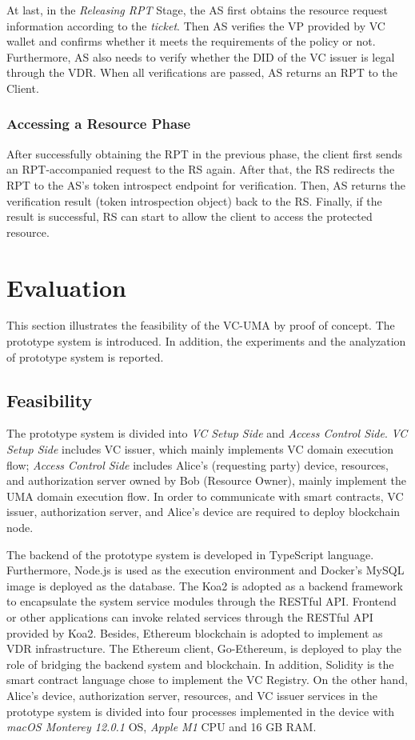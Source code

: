 \documentclass[conference, dvipdfmx]{IEEEtran} %
\begin{document}
\begin{sloppypar}
At last, in the \textit{Releasing RPT} Stage, the AS first obtains the resource request information according to the \textit{ticket}. Then AS verifies the VP provided by VC wallet and confirms whether it meets the requirements of the policy or not. Furthermore, AS also needs to verify whether the DID of the VC issuer is legal through the VDR. When all verifications are passed, AS returns an RPT to the Client.

\subsubsection{Accessing a Resource Phase}
After successfully obtaining the RPT in the previous phase, the client first sends an RPT-accompanied request to the RS again. After that, the RS redirects the RPT to the AS's token introspect endpoint for verification. 
Then, AS returns the verification result (token introspection object) back to the RS. Finally, if the result is successful, RS can start to allow the client to access the protected resource.

\section{Evaluation}
\label{sec:Evaluation}

This section illustrates the feasibility of the VC-UMA by proof of concept. The prototype system is introduced. In addition, the experiments and the analyzation of prototype system is reported.

\subsection{Feasibility}

The prototype system is divided into \textit{VC Setup Side} and \textit{Access Control Side}. \textit{VC Setup Side} includes VC issuer, which mainly implements VC domain execution flow; \textit{Access Control Side} includes Alice's (requesting party) device, resources, and authorization server owned by Bob (Resource Owner), mainly implement the UMA domain execution flow. In order to communicate with smart contracts, VC issuer, authorization server, and Alice's device are required to deploy blockchain node.

The backend of the prototype system is developed in TypeScript language. Furthermore, Node.js is used as the execution environment and Docker's MySQL image is deployed as the database. 
The Koa2 is adopted as a backend framework to encapsulate the system service modules through the RESTful API. Frontend or other applications can invoke related services through the RESTful API provided by Koa2. 
Besides, Ethereum blockchain is adopted to implement as VDR infrastructure. The Ethereum client,  Go-Ethereum\cite{geth}, is deployed to play the role of bridging the backend system and blockchain. In addition, Solidity is the smart contract language chose to implement the VC Registry. 
On the other hand, Alice's device, authorization server, resources, and VC issuer services in the prototype system is divided into four processes implemented in the device with \textit{macOS Monterey 12.0.1} OS, \textit{Apple M1} CPU and 16 GB RAM.


\end{sloppypar}
\end{document}
